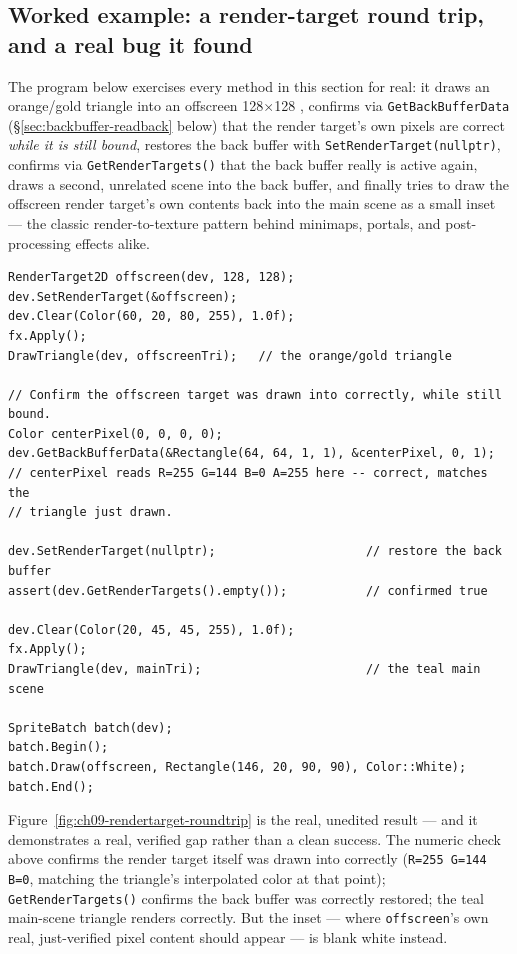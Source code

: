 \subsection{Worked example: a render-target round trip, and a real bug it found}
\label{sec:worked-rendertarget}

The program below exercises every method in this section for real: it draws an orange/gold
triangle into an offscreen 128$\times$128 , confirms via
\texttt{GetBackBufferData} (\S\ref{sec:backbuffer-readback} below) that the render target's own
pixels are correct \emph{while it is still bound}, restores the back buffer with
\texttt{SetRenderTarget(nullptr)}, confirms via \texttt{GetRenderTargets()} that the back
buffer really is active again, draws a second, unrelated scene into the back buffer, and
finally tries to draw the offscreen render target's own contents back into the main scene as a
small inset --- the classic render-to-texture pattern behind minimaps, portals, and
post-processing effects alike.

\begin{lstlisting}
RenderTarget2D offscreen(dev, 128, 128);
dev.SetRenderTarget(&offscreen);
dev.Clear(Color(60, 20, 80, 255), 1.0f);
fx.Apply();
DrawTriangle(dev, offscreenTri);   // the orange/gold triangle

// Confirm the offscreen target was drawn into correctly, while still bound.
Color centerPixel(0, 0, 0, 0);
dev.GetBackBufferData(&Rectangle(64, 64, 1, 1), &centerPixel, 0, 1);
// centerPixel reads R=255 G=144 B=0 A=255 here -- correct, matches the
// triangle just drawn.

dev.SetRenderTarget(nullptr);                     // restore the back buffer
assert(dev.GetRenderTargets().empty());           // confirmed true

dev.Clear(Color(20, 45, 45, 255), 1.0f);
fx.Apply();
DrawTriangle(dev, mainTri);                       // the teal main scene

SpriteBatch batch(dev);
batch.Begin();
batch.Draw(offscreen, Rectangle(146, 20, 90, 90), Color::White);
batch.End();
\end{lstlisting}

Figure~\ref{fig:ch09-rendertarget-roundtrip} is the real, unedited result --- and it demonstrates
a real, verified gap rather than a clean success. The numeric check above confirms the render
target itself was drawn into correctly (\texttt{R=255 G=144 B=0}, matching the triangle's
interpolated color at that point); \texttt{GetRenderTargets()} confirms the back buffer was
correctly restored; the teal main-scene triangle renders correctly. But the inset --- where
\texttt{offscreen}'s own real, just-verified pixel content should appear --- is blank white
instead.


